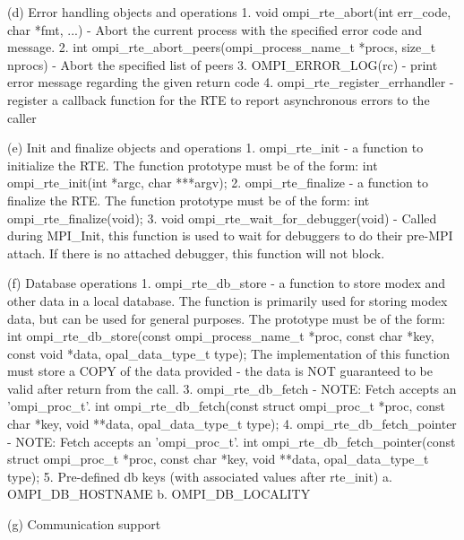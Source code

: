 (d) Error handling objects and operations
     1. void ompi_rte_abort(int err_code, char *fmt, ...) - Abort the current
        process with the specified error code and message.
     2. int ompi_rte_abort_peers(ompi_process_name_t *procs, size_t nprocs) -
        Abort the specified list of peers
     3. OMPI_ERROR_LOG(rc) - print error message regarding the given return code
     4. ompi_rte_register_errhandler - register a callback function for the RTE
        to report asynchronous errors to the caller

 (e) Init and finalize objects and operations
     1. ompi_rte_init - a function to initialize the RTE. The function
        prototype must be of the form:
        int ompi_rte_init(int *argc, char ***argv);
     2. ompi_rte_finalize - a function to finalize the RTE. The function
        prototype must be of the form:
        int ompi_rte_finalize(void);
     3. void ompi_rte_wait_for_debugger(void) - Called during MPI_Init, this
        function is used to wait for debuggers to do their pre-MPI attach.
        If there is no attached debugger, this function will not block.

 (f) Database operations
     1. ompi_rte_db_store - a function to store modex and other data in
        a local database. The function is primarily used for storing modex
        data, but can be used for general purposes. The prototype must be
        of the form:
        int ompi_rte_db_store(const ompi_process_name_t *proc,
                              const char *key, const void *data,
                              opal_data_type_t type);
        The implementation of this function must store a COPY of the data
        provided - the data is NOT guaranteed to be valid after return
        from the call.
     3. ompi_rte_db_fetch -
        NOTE: Fetch accepts an 'ompi_proc_t'.
        int ompi_rte_db_fetch(const struct ompi_proc_t *proc,
                              const char *key,
                              void **data,
                              opal_data_type_t type);
     4. ompi_rte_db_fetch_pointer -
        NOTE: Fetch accepts an 'ompi_proc_t'.
        int ompi_rte_db_fetch_pointer(const struct ompi_proc_t *proc,
                                      const char *key,
                                      void **data,
                                      opal_data_type_t type);
     5. Pre-defined db keys (with associated values after rte_init)
        a. OMPI_DB_HOSTNAME
        b. OMPI_DB_LOCALITY

  (g) Communication support

